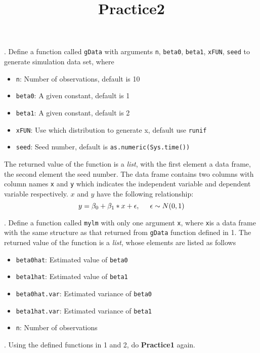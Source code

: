 \documentclass[a4paper,25pt]{article}
\title{Practice2}
\author{}
\begin{document}
\maketitle
\begin{Large}
. Define a function called \texttt{gData} with arguments \texttt{n},  \texttt{beta0}, \texttt{beta1}, \texttt{xFUN}, \texttt{seed} to generate simulation data set, where
\begin{itemize}
	\item \texttt{n}: Number of observations, default is 10
	\item \texttt{beta0}: A given constant, default is 1
	\item \texttt{beta1}: A given constant, default is 2
	\item \texttt{xFUN}: Use which distribution to generate x, default use \texttt{runif}
	\item \texttt{seed}: Seed number, default is \texttt{as.numeric(Sys.time())}
\end{itemize}
The returned value of the function is a {\em list}, with the first element a data frame, the second element the seed number. 
The data frame contains two columns with column names \texttt{x} and \texttt{y} which indicates the independent variable and dependent variable respectively.
$x$ and $y$ have the following relationship:
$$y = \beta_0 + \beta_1*x + \epsilon,\hspace{0.5cm} \epsilon \sim N(0, 1)$$

. Define a function called \texttt{mylm} with only one argument \texttt{x}, where \texttt{x}is a data frame with the same structure as that returned from \texttt{gData} function defined in 1. The returned value of the function is a {\em list}, whose elements are listed as follows
\begin{itemize}
	\item \texttt{beta0hat}: Estimated value of \texttt{beta0}
	\item \texttt{beta1hat}: Estimated value of \texttt{beta1}
	\item \texttt{beta0hat.var}: Estimated variance of \texttt{beta0}
	\item \texttt{beta1hat.var}: Estimated variance of \texttt{beta1}
	\item \texttt{n}: Number of observations
\end{itemize}

. Using the defined functions in 1 and 2, do \textbf{Practice1} again. 
\end{Large}
\end{document}
